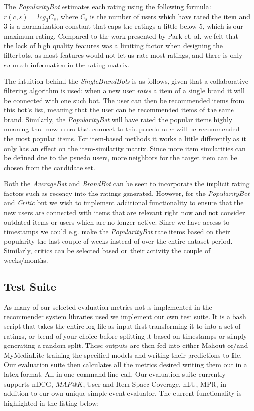 The \emph{PopularityBot} estimates each rating using the following formula: $r(c,s) = log_{3}C_{s}$, where $C_{s}$ is the number of users which have rated the item and $3$ is a normalization constant that caps the ratings a little below 5, which is our maximum rating.
Compared to the work presented by Park et. al. we felt that the lack of high quality features was a limiting factor when designing the filterbots, as most features would not let us rate most ratings, and there is only so much information in the rating matrix.

The intuition behind the \emph{SingleBrandBots} is as follows, given that a collaborative filtering algorithm is used:
when a new user \emph{rates} a item of a single brand it will be connected with one such bot. The user can then be recommended
items from this bot's list, meaning that the user can be recommended items of the same brand. Similarly, the \emph{PopularityBot}
will have rated the popular items highly meaning that new users that connect to this psuedo user will be recommended the
most popular items. For item-based methods it works a little differently as it only has an effect on the item-similarity matrix.
Since more item similarities can be defined due to the psuedo users, more neighbors for the target item can be chosen from the candidate set.

Both the \emph{AverageBot} and \emph{BrandBot} can be seen to incorporate the implicit rating factors such as recency into
the ratings generated. However, for the \emph{PopularityBot} and \emph{Critic} but we wish to implement additional functionality to ensure
that the new users are connected with items that are relevant right now and not consider outdated items or users which
are no longer active. Since we have access to timestamps we could e.g. make the \emph{PopularityBot} rate items based on
their popularity the last couple of weeks instead of over the entire dataset period. Similarly, critics can be selected
based on their activity the couple of weeks/months.

\subsection{Test Suite}

As many of our selected evaluation metrics not is implemented in the recommender system libraries used we implement our own test suite. It is a bash
script that takes the entire log file as input first transforming it to into a set of ratings, or blend of your choice before splitting it based on timestamps
or simply generating a random split. These outputs are then fed into either Mahout or/and MyMediaLite training the specified models and writing their predictions to file. Our evaluation suite then calculates all the metrics desired writing them out in a latex format. All in one command line call. Our evaluation suite currently supports nDCG, $MAP@K$, User and Item-Space Coverage, hLU, MPR, in addition to our own unique simple event evaluator. The current functionality is
highlighted in the listing below:

